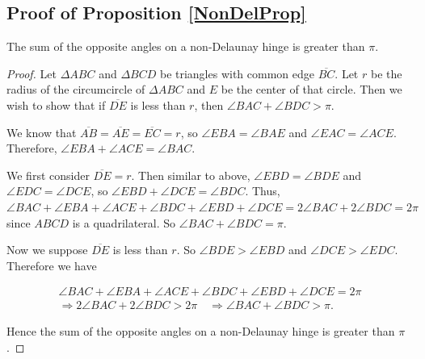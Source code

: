 \documentclass[12pt]{article}
\begin{document}
\subsection{Proof of Proposition \ref{NonDelProp}}
The sum of the opposite angles on a non-Delaunay hinge is greater than $\pi$.
\begin{proof}
\label{prop1}
Let $\Delta ABC$ and $\Delta BCD$ be triangles with common edge $\overline{BC}$. Let $r$ be the radius of the circumcircle of  $\Delta ABC$ and $E$ be the center of that circle. Then we wish to show that if $\overline{DE}$ is less than $r$, then $\angle BAC + \angle BDC > \pi$.\newline

\noindent We know that $\overline{AB}=\overline{AE}=\overline{EC}=r$, so $\angle EBA = \angle BAE$ and $\angle EAC = \angle ACE$. Therefore, $\angle EBA + \angle ACE= \angle BAC$.\newline

\noindent We first consider $\overline{DE}=r$. Then similar to above, $\angle EBD = \angle BDE$ and $\angle EDC = \angle DCE$, so $\angle EBD + \angle DCE= \angle BDC$. Thus, $\angle BAC + \angle EBA + \angle ACE + \angle BDC + \angle EBD + \angle DCE = 2\angle BAC + 2\angle BDC = 2\pi$
since $ABCD$ is a quadrilateral. So $\angle BAC + \angle BDC = \pi$.\newline

\noindent Now we suppose $\overline{DE}$ is less than $r$. So $\angle BDE > \angle EBD$ and $\angle DCE > \angle EDC$. Therefore we have

\begin{align*}
\angle BAC + \angle EBA + \angle ACE + \angle BDC + \angle EBD + \angle DCE = 2\pi \\
\Rightarrow 2\angle BAC + 2\angle BDC > 2\pi \quad \Rightarrow \angle BAC + \angle BDC > \pi.
\end{align*}

\noindent Hence the sum of the opposite angles on a non-Delaunay hinge is greater than $\pi$. \qedhere
\end{proof}
\end{document}
